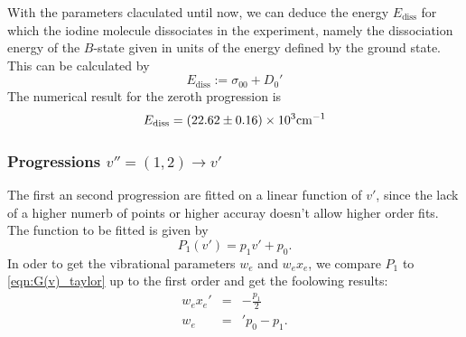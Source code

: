 With the parameters claculated until now, we can deduce the energy $E_\mathrm{diss}$ 
for which the iodine molecule dissociates in the experiment, 
namely the dissociation energy of the $B$-state given in units of the 
energy defined by the ground state. This can be calculated by
\begin{equation}
    E_\mathrm{diss} := \sigma_{00} + D_0'
    \label{eq:E_diss}
\end{equation}
The numerical result for the zeroth progression is
\begin{equation}
    E_\mathrm{diss} = \left(22.62 \pm 0.16\right) \times 10^{3} \mathrm{cm^{-1}}
\end{equation}

\newpage



\subsubsection{Progressions $v'' = (1, 2) \rightarrow v'$}
The first an second progression are fitted on a linear function of $v'$, since 
the lack of a higher numerb of points or higher accuray doesn't allow higher order fits.
The function to be fitted is given by
\begin{equation}
    P_1(v') = p_1 v' + p_0.
\end{equation}
In oder to get the vibrational parameters $w_e$ and $w_e x_e$, we compare $P_1$ to 
\eqref{eqn:G(v)_taylor} up to the first order and get the foolowing results: 
\begin{eqnarray}
    w_e x_e' &=& -\frac{p_1}{2} \\
    w_e &=&' p_0 - p_1.
\end{eqnarray}

